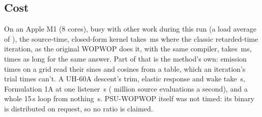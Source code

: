 \documentclass[10pt,a4paper,twocolumn]{article}
\begin{document}
\subsection{Cost}\label{sec:cost}
On an Apple M1 (8 cores), busy with other work during this run (a load average of \NBeLoad), the source-time, closed-form kernel takes \NBeSrc\,ms where the classic retarded-time iteration, as the original WOPWOP does it, with the same compiler, takes \NBeRet\,ms, \NBeRatio{} times as long for the same answer. Part of that is the method's own: emission times on a grid read their sines and cosines from a table, which an iteration's trial times can't. A UH-60A descent's trim, elastic response and wake take \NBeTrim\,s, Formulation 1A at one listener \NBeFa\,s (\NBeRate{} million source evaluations a second), and a whole 15\,s loop from nothing \NBeLoop\,s. PSU-WOPWOP itself was not timed: its binary is distributed on request, so no ratio is claimed.

\end{document}
